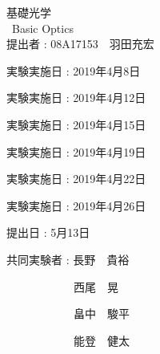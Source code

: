 \documentclass[11pt, a4paper]{jsarticle}
\begin{document}
\begin{titlepage}
  \begin{center}
    {\Huge 基礎光学 \\ Basic Optics}\\ %
    \vspace{30truept}
    {\huge 提出者 : 08A17153　羽田充宏}\\ %
    \vspace{50truept}

    \begin{list}{}{\setlength{\leftmargin}{80pt}}
    \item {\huge 実験実施日 : 2019年4月8日}\\
    \vspace{10truept}
    \item {\huge 実験実施日 : 2019年4月12日}\\
    \vspace{10truept}
    \item {\huge 実験実施日 : 2019年4月15日}\\
    \vspace{10truept}
    \item {\huge 実験実施日 : 2019年4月19日}\\
    \vspace{10truept}
    \item {\huge 実験実施日 : 2019年4月22日}\\
    \vspace{10truept}
    \item {\huge 実験実施日 : 2019年4月26日}\\
    \end{list}

    \vspace{50truept}
    {\huge 提出日 : 5月13日}\\ %
    \vspace{30truept}
    \begin{list}{}{\setlength{\leftmargin}{70pt}}
    \item {\huge 共同実験者 : 長野　貴裕}
    \item {\huge　　　　　　西尾　晃}
    \item {\huge　　　　　　畠中　駿平}
    \item {\huge　　　　　　能登　健太}
    \end{list}
  \end{center}
\end{titlepage}
\end{document}
